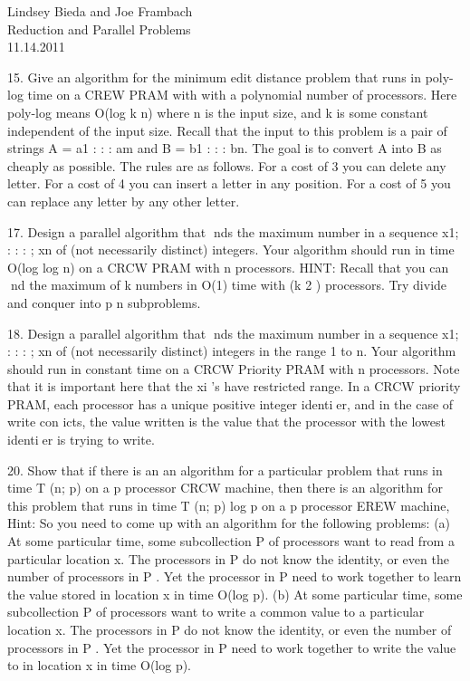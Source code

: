 \documentclass[10pt]{article}
\begin{document}
	\begin{flushright}
	Lindsey Bieda and Joe Frambach\\
	Reduction and Parallel Problems\\
	11.14.2011
	\end{flushright}

15. Give an algorithm for the minimum edit distance problem that runs in poly-log time on a CREW
PRAM with with a polynomial number of processors. Here poly-log means O(log
k
n) where n is the
input size, and k is some constant independent of the input size.
Recall that the input to this problem is a pair of strings A = a1 : : : am and B = b1 : : : bn. The goal is
to convert A into B as cheaply as possible. The rules are as follows. For a cost of 3 you can delete any
letter. For a cost of 4 you can insert a letter in any position. For a cost of 5 you can replace any letter
by any other letter.


17. Design a parallel algorithm that nds the maximum number in a sequence x1; : : : ; xn of (not necessarily
distinct) integers. Your algorithm should run in time O(log log n) on a CRCW PRAM with n processors.
HINT: Recall that you can nd the maximum of k numbers in O(1) time with 
(k
2
) processors. Try
divide and conquer into
p
n subproblems.


18. Design a parallel algorithm that nds the maximum number in a sequence x1; : : : ; xn of (not necessarily
distinct) integers in the range 1 to n. Your algorithm should run in constant time on a CRCW Priority
PRAM with n processors. Note that it is important here that the xi
's have restricted range. In a
CRCW priority PRAM, each processor has a unique positive integer identier, and in the case of write
con
icts, the value written is the value that the processor with the lowest identier is trying to write.


20. Show that if there is an an algorithm for a particular problem that runs in time T (n; p) on a p
processor CRCW machine, then there is an algorithm for this problem that runs in time T (n; p) log p
on a p processor EREW machine,
Hint: So you need to come up with an algorithm for the following problems:
(a) At some particular time, some subcollection P of processors want to read from a particular location
x. The processors in P do not know the identity, or even the number of processors in P . Yet the
processor in P need to work together to learn the value stored in location x in time O(log p).
(b) At some particular time, some subcollection P of processors want to write a common value to
a particular location x. The processors in P do not know the identity, or even the number of
processors in P . Yet the processor in P need to work together to write the value to in location x
in time O(log p).
\end{document}

